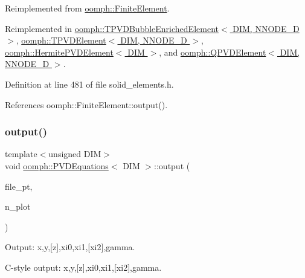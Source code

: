 Reimplemented from \hyperlink{classoomph_1_1FiniteElement_a72cddd09f8ddbee1a20a1ff404c6943e}{oomph\+::\+Finite\+Element}.



Reimplemented in \hyperlink{classoomph_1_1TPVDBubbleEnrichedElement_a7ca640dacf5edd48e1f726a09c207a9b}{oomph\+::\+T\+P\+V\+D\+Bubble\+Enriched\+Element$<$ D\+I\+M, N\+N\+O\+D\+E\+\_\+D $>$}, \hyperlink{classoomph_1_1TPVDElement_a272dff6c1e74e2634e2df71b33319e19}{oomph\+::\+T\+P\+V\+D\+Element$<$ D\+I\+M, N\+N\+O\+D\+E\+\_\+D $>$}, \hyperlink{classoomph_1_1HermitePVDElement_a5567656681b134890e6940972a2461d5}{oomph\+::\+Hermite\+P\+V\+D\+Element$<$ D\+I\+M $>$}, and \hyperlink{classoomph_1_1QPVDElement_a5955081a120c29aafbfc23a3b40b0c12}{oomph\+::\+Q\+P\+V\+D\+Element$<$ D\+I\+M, N\+N\+O\+D\+E\+\_\+D $>$}.



Definition at line 481 of file solid\+\_\+elements.\+h.



References oomph\+::\+Finite\+Element\+::output().

\mbox{\label{classoomph_1_1PVDEquations_ac35042c495411ffc96501d6705b8fa7a}} 
\subsubsection{\texorpdfstring{output()}{output()}\hspace{0.1cm}{\footnotesize\ttfamily [4/4]}}
{\footnotesize\ttfamily template$<$unsigned D\+IM$>$ \\
void \hyperlink{classoomph_1_1PVDEquations}{oomph\+::\+P\+V\+D\+Equations}$<$ D\+IM $>$\+::output (\begin{DoxyParamCaption}\item[{F\+I\+LE $\ast$}]{file\+\_\+pt,  }\item[{const unsigned \&}]{n\+\_\+plot }\end{DoxyParamCaption})\hspace{0.3cm}{\ttfamily [virtual]}}



Output\+: x,y,\mbox{[}z\mbox{]},xi0,xi1,\mbox{[}xi2\mbox{]},gamma. 

C-\/style output\+: x,y,\mbox{[}z\mbox{]},xi0,xi1,\mbox{[}xi2\mbox{]},gamma. 

